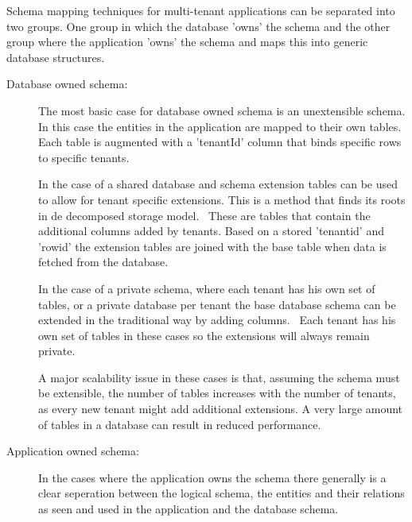 Schema mapping techniques for multi-tenant applications can be separated into two groups. 
One group in which the database 'owns' the schema and the other group where the application 'owns' the schema and maps this into generic database structures.~\cite{aulbach2009comparison}

\begin{description}
	\item[Database owned schema: ] The most basic case for database owned schema is an unextensible schema.
		In this case the entities in the application are mapped to their own tables.
		Each table is augmented with a 'tenantId' column that binds specific rows to specific tenants.~\cite{aulbach2008multi}

		In the case of a shared database and schema extension tables can be used to allow for tenant specific extensions.
		This is a method that finds its roots in de decomposed storage model.~\cite{copeland1985decomposition}
		These are tables that contain the additional columns added by tenants. 
		Based on a stored 'tenantid' and 'rowid' the extension tables are joined with the base table when data is fetched from the database.~\cite{aulbach2008multi}

		In the case of a private schema, where each tenant has his own set of tables, or a private database per tenant the base database schema can be extended in the traditional way by adding columns.~\cite{aulbach2009comparison}
		Each tenant has his own set of tables in these cases so the extensions will always remain private. 
	
		A major scalability issue in these cases is that, assuming the schema must be extensible, the number of tables increases with the number of tenants, as every new tenant might add additional extensions.
		A very large amount of tables in a database can result in reduced performance.~\cite{aulbach2008multi}
	\item[Application owned schema: ] In the cases where the application owns the schema there generally is a clear seperation between the logical schema, the entities and their relations as seen and used in the application and the database schema.
\end{description}

